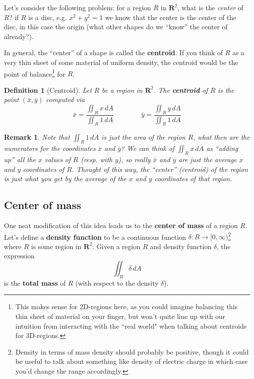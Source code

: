 \documentclass[12pt]{article}
\numberwithin{equation}{subsection}
\numberwithin{figure}{subsection}
\newtheorem{defn}[subsection]{Definition}
\theoremstyle{note}
\newtheorem{remark}[subsection]{Remark}
\begin{document}
{Let's consider the following problem: for a region $R$ in $\mathbf{R}^2$, what is the \textit{center} of $R$? if $R$ is a disc, e.g. $x^2+y^2=1$ we know that the center is the center of the disc, in this case the origin (what other shapes do we ``know'' the center of already?). 

In general, the ``center'' of a shape is called the \textbf{centroid}. If you think of $R$ as a very thin sheet of some material of uniform density, the centroid would be the point of balance\footnote{This makes sense for 2D-regions here, as you could imagine balancing this thin sheet of material on your finger, but won't quite line up with our intuition from interacting with the ``real world" when talking about centroids for 3D-regions.} for $R$. 

\begin{defn}[Centroid]Let $R$ be a region in $\mathbf{R}^2$. The \textbf{centroid} of $R$ is the point $(\bar{x},\bar{y})$ computed via \begin{equation}
	\label{centroid} \bar{x} =\dfrac{\iint_R x\,dA}{\iint_R 1\,dA} \qquad \qquad \bar{y} =\dfrac{\iint_R y\,dA}{\iint_R 1\,dA}
\end{equation} \label{centroid-def-2}
\end{defn}
\begin{remark}Note that $\iint_R 1\,dA$ is just the \textit{area} of the region $R$, what then are the numerators for the coordinates $\bar{x}$ and $\bar{y}$? We can think of $\iint_R x\,dA$ as ``adding up'' all the $x$ values of $R$ (resp. with $y$), so really $\bar{x}$ and $\bar{y}$ are just the \textit{average} $x$ and $y$ coordinates of $R$. Thought of this way, the ``center'' (centroid) of the region is just what you get by the average of the $x$ and $y$ coordinates of that region. \end{remark}

\subsection{Center of mass}
One neat modification of this idea leads us to the \textbf{center of mass} of a region $R$. Let's define a \textbf{density function} to be a continuous function $\delta\colon R\to [0,\infty)$\footnote{Density in terms of mass density should probably be positive, though it could be useful to talk about something like density of electric charge in which case you'd change the range accordingly.} where $R$ is some region in $\mathbf{R}^2$. Given a region $R$ and density function $\delta$, the expression \begin{equation} \iint_R \delta \,dA\end{equation} is the \textbf{total mass} of $R$ (with respect to the density $\delta$).

}
\end{document}

